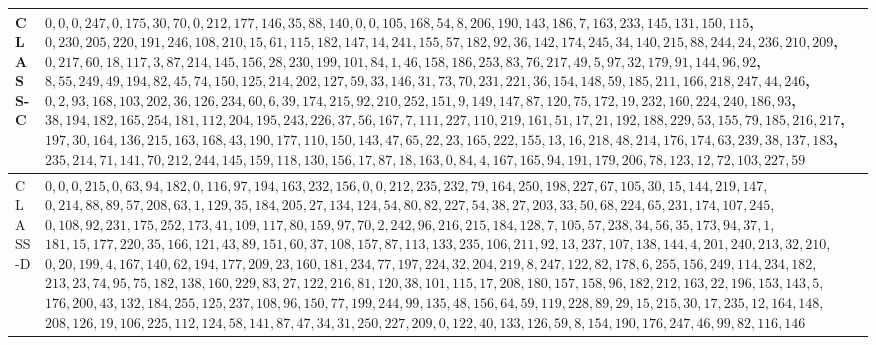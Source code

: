 \documentclass[10pt]{article}
\begin{document}
\begin{table}[h]
\begin{center}
\begin{tabular}{|l|l|}
\hline
CLASS-C & $0,0,0,247,0,175,30,70,0,212,177,146,35,88,140,0,0,105,168,54,8,206,190,143,186,7,163,233,145,131,150,115$, $0,230,205,220,191,246,108,210,15,61,115,182,147,14,241,155,57,182,92,36,142,174,245,34,140,215,88,244,24,236,210,209$, $0,217,60,18,117,3,87,214,145,156,28,230,199,101,84,1,46,158,186,253,83,76,217,49,5,97,32,179,91,144,96,92$, $8,55,249,49,194,82,45,74,150,125,214,202,127,59,33,146,31,73,70,231,221,36,154,148,59,185,211,166,218,247,44,246$, $0,2,93,168,103,202,36,126,234,60,6,39,174,215,92,210,252,151,9,149,147,87,120,75,172,19,232,160,224,240,186,93$, $38,194,182,165,254,181,112,204,195,243,226,37,56,167,7,111,227,110,219,161,51,17,21,192,188,229,53,155,79,185,216,217$, $197,30,164,136,215,163,168,43,190,177,110,150,143,47,65,22,23,165,222,155,13,16,218,48,214,176,174,63,239,38,137,183$, $235,214,71,141,70,212,244,145,159,118,130,156,17,87,18,163,0,84,4,167,165,94,191,179,206,78,123,12,72,103,227,59$ \\
\hline
CLASS-D & $0,0,0,215,0,63,94,182,0,116,97,194,163,232,156,0,0,212,235,232,79,164,250,198,227,67,105,30,15,144,219,147$, $0,214,88,89,57,208,63,1,129,35,184,205,27,134,124,54,80,82,227,54,38,27,203,33,50,68,224,65,231,174,107,245$, $0,108,92,231,175,252,173,41,109,117,80,159,97,70,2,242,96,216,215,184,128,7,105,57,238,34,56,35,173,94,37,1$, $181,15,177,220,35,166,121,43,89,151,60,37,108,157,87,113,133,235,106,211,92,13,237,107,138,144,4,201,240,213,32,210$, $0,20,199,4,167,140,62,194,177,209,23,160,181,234,77,197,224,32,204,219,8,247,122,82,178,6,255,156,249,114,234,182$, $213,23,74,95,75,182,138,160,229,83,27,122,216,81,120,38,101,115,17,208,180,157,158,96,182,212,163,22,196,153,143,5$, $176,200,43,132,184,255,125,237,108,96,150,77,199,244,99,135,48,156,64,59,119,228,89,29,15,215,30,17,235,12,164,148$, $208,126,19,106,225,112,124,58,141,87,47,34,31,250,227,209,0,122,40,133,126,59,8,154,190,176,247,46,99,82,116,146$ \\
\hline
\end{tabular}
\end{center}
\end{table}
\end{document}
